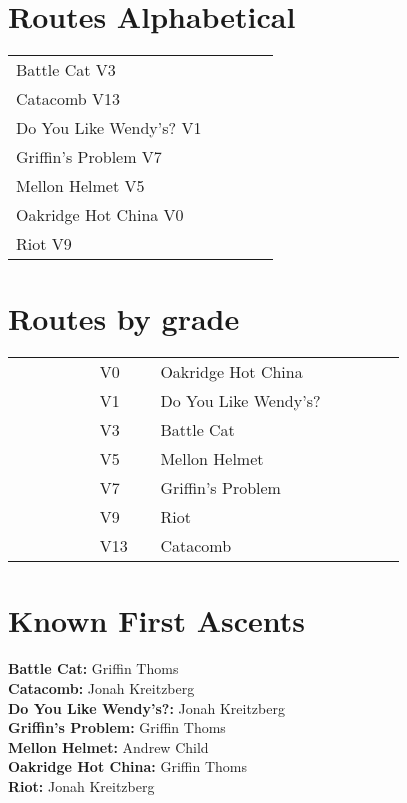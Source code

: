 \begin{flushleft}

\needspace{1.5cm}
\section{Routes Alphabetical}
\begin{center}
\begin{supertabular}{p{0.76\linewidth}p{0.08\linewidth}}
Battle Cat V3 & \pageref{rt:Battle Cat} \\
Catacomb V13 & \pageref{rt:Catacomb} \\
Do You Like Wendy's? V1 & \pageref{vr:Do You Like Wendy's?} \\
Griffin's Problem V7 & \pageref{rt:Griffin's Problem} \\
Mellon Helmet V5 & \pageref{rt:Mellon Helmet} \\
Oakridge Hot China V0 & \pageref{rt:Oakridge Hot China} \\
Riot V9 & \pageref{rt:Riot} \\
\end{supertabular}
\end{center}
\needspace{1.5cm}
\section{Routes by grade}
\begin{center}
\begin{supertabular}{p{0.18\linewidth}p{0.13\linewidth}p{0.45\linewidth}p{0.08\linewidth}}
 &V0&Oakridge Hot China & \pageref{rt:Oakridge Hot China} \\
 &V1&Do You Like Wendy's? & \pageref{vr:Do You Like Wendy's?} \\
 &V3&Battle Cat & \pageref{rt:Battle Cat} \\
 &V5&Mellon Helmet & \pageref{rt:Mellon Helmet} \\
 &V7&Griffin's Problem & \pageref{rt:Griffin's Problem} \\
 &V9&Riot & \pageref{rt:Riot} \\
 &V13&Catacomb & \pageref{rt:Catacomb} \\
\end{supertabular}
\end{center}
\section{Known First Ascents}
\textbf{Battle Cat:} Griffin Thoms\\
\textbf{Catacomb:} Jonah Kreitzberg\\
\textbf{Do You Like Wendy's?:} Jonah Kreitzberg\\
\textbf{Griffin's Problem:} Griffin Thoms\\
\textbf{Mellon Helmet:} Andrew Child\\
\textbf{Oakridge Hot China:} Griffin Thoms\\
\textbf{Riot:} Jonah Kreitzberg\\
\end{flushleft}
\onecolumn
\clearpage